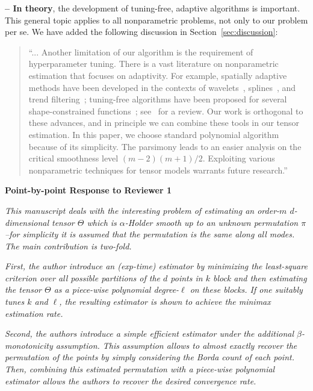 \documentclass[11pt]{article}
\theoremstyle{plain}
\theoremstyle{definition}
\begin{document}
\begin{enumerate}[wide, labelwidth=!, labelindent=0pt]
{\bf -- In theory}, the development of tuning-free, adaptive algorithms is important. This general topic applies to all nonparametric problems, not only to our problem per se. We have added the following discussion in Section~\ref{sec:discussion}:

\begin{quote}
``...{\color{blue} Another limitation of our algorithm is the requirement of hyperparameter tuning. There is a vast literature on nonparametric estimation that focuses on adaptivity. For example, spatially adaptive methods have been developed in the contexts of wavelets~\citep{donoho1994ideal}, splines~\citep{mammen1997locally}, and trend filtering~\citep{tibshirani2014adaptive}; tuning-free algorithms have been proposed for several shape-constrained functions~\citep{chatterjee2019adaptive,feng2022nonparametric,bellec2018sharp}; see~\citep{cai2012minimax} for a review. Our work is orthogonal to these advances, and in principle we can combine these tools in our tensor estimation.} In this paper, we choose standard polynomial algorithm because of its simplicity. The parsimony leads to an easier analysis on the critical smoothness level $ (m-2)(m+1)/2$. Exploiting various nonparametric techniques for tensor models warrants future research.''
\end{quote}


\end{enumerate}

\newpage

\begin{center}
    \textbf{Point-by-point Response to Reviewer 1}
\end{center}

\emph{This manuscript deals with the interesting problem of estimating an order-$m$ $d$-dimensional tensor $\Theta$ which is $\alpha$-Holder smooth up to an unknown permutation $\pi$--for simplicity it is assumed that the permutation is the same along all modes. The main contribution is two-fold.}

\emph{First, the author introduce an (exp-time) estimator by minimizing the least-square criterion over all possible partitions of the $d$ points in $k$ block and then estimating the tensor $\Theta$ as a piece-wise polynomial degree-$\ell$ on these blocks. If one suitably tunes $k$ and $\ell$, the resulting estimator is shown to achieve the minimax estimation rate.}

\emph{Second, the authors introduce a simple efficient estimator under the additional $\beta$-monotonicity assumption. This assumption allows to almost exactly recover the permutation of the points by simply considering the Borda count of each point. Then, combining this estimated permutation with a piece-wise polynomial estimator allows the authors to recover the desired convergence rate.}
\end{document}
